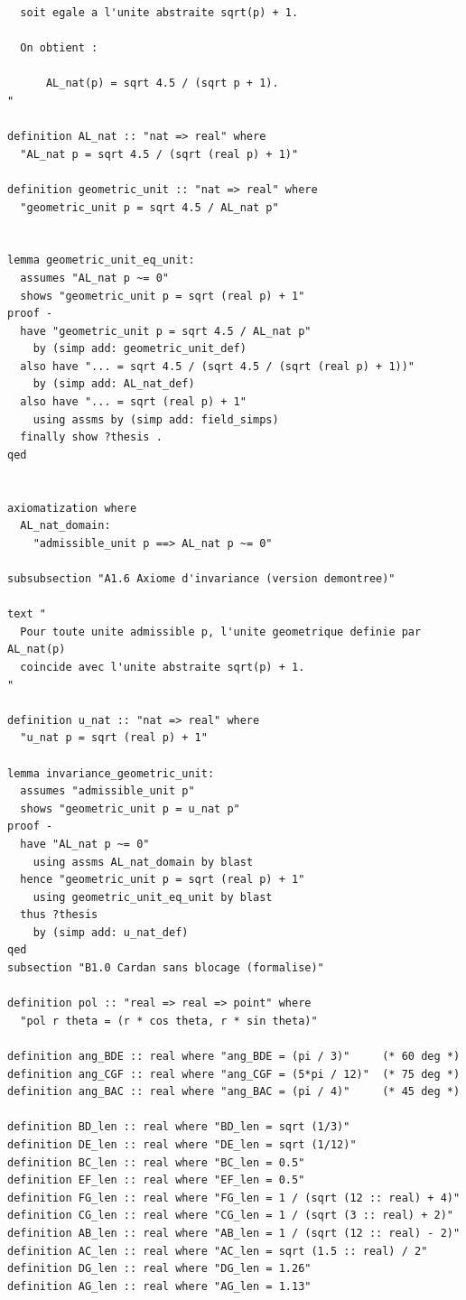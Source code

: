 \documentclass[12pt,a4paper]{article}
\theoremstyle{definition}
\theoremstyle{remark}
\begin{document}
\begin{verbatim}
  soit egale a l'unite abstraite sqrt(p) + 1.

  On obtient :

      AL_nat(p) = sqrt 4.5 / (sqrt p + 1).
"

definition AL_nat :: "nat => real" where
  "AL_nat p = sqrt 4.5 / (sqrt (real p) + 1)"

definition geometric_unit :: "nat => real" where
  "geometric_unit p = sqrt 4.5 / AL_nat p"


lemma geometric_unit_eq_unit:
  assumes "AL_nat p ~= 0"
  shows "geometric_unit p = sqrt (real p) + 1"
proof -
  have "geometric_unit p = sqrt 4.5 / AL_nat p"
    by (simp add: geometric_unit_def)
  also have "... = sqrt 4.5 / (sqrt 4.5 / (sqrt (real p) + 1))"
    by (simp add: AL_nat_def)
  also have "... = sqrt (real p) + 1"
    using assms by (simp add: field_simps)
  finally show ?thesis .
qed


axiomatization where
  AL_nat_domain:
    "admissible_unit p ==> AL_nat p ~= 0"

subsubsection "A1.6 Axiome d'invariance (version demontree)"

text "
  Pour toute unite admissible p, l'unite geometrique definie par AL_nat(p)
  coincide avec l'unite abstraite sqrt(p) + 1.
"

definition u_nat :: "nat => real" where
  "u_nat p = sqrt (real p) + 1"

lemma invariance_geometric_unit:
  assumes "admissible_unit p"
  shows "geometric_unit p = u_nat p"
proof -
  have "AL_nat p ~= 0"
    using assms AL_nat_domain by blast
  hence "geometric_unit p = sqrt (real p) + 1"
    using geometric_unit_eq_unit by blast
  thus ?thesis
    by (simp add: u_nat_def)
qed
subsection "B1.0 Cardan sans blocage (formalise)"

definition pol :: "real => real => point" where
  "pol r theta = (r * cos theta, r * sin theta)"

definition ang_BDE :: real where "ang_BDE = (pi / 3)"     (* 60 deg *)
definition ang_CGF :: real where "ang_CGF = (5*pi / 12)"  (* 75 deg *)
definition ang_BAC :: real where "ang_BAC = (pi / 4)"     (* 45 deg *)

definition BD_len :: real where "BD_len = sqrt (1/3)"
definition DE_len :: real where "DE_len = sqrt (1/12)"
definition BC_len :: real where "BC_len = 0.5"
definition EF_len :: real where "EF_len = 0.5"
definition FG_len :: real where "FG_len = 1 / (sqrt (12 :: real) + 4)"
definition CG_len :: real where "CG_len = 1 / (sqrt (3 :: real) + 2)"
definition AB_len :: real where "AB_len = 1 / (sqrt (12 :: real) - 2)"
definition AC_len :: real where "AC_len = sqrt (1.5 :: real) / 2"
definition DG_len :: real where "DG_len = 1.26"
definition AG_len :: real where "AG_len = 1.13"


\end{verbatim}
\end{document}
